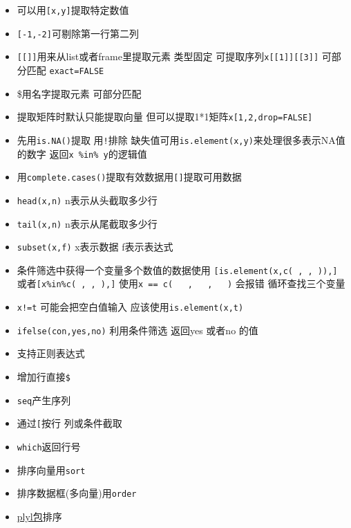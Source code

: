 \documentclass[
]{book}
\providecommand{\tightlist}{%
  \setlength{\itemsep}{0pt}\setlength{\parskip}{0pt}}
\begin{document}
\begin{itemize}
\tightlist
\item
  可以用\texttt{{[}x,y{]}}提取特定数值
\item
  \texttt{{[}-1,-2{]}}可剔除第一行第二列
\item
  \texttt{{[}{[}{]}{]}}用来从list或者frame里提取元素 类型固定 可提取序列\texttt{x{[}{[}1{]}{]}{[}{[}3{]}{]}} 可部分匹配 \texttt{exact=FALSE}
\item
  \$用名字提取元素 可部分匹配
\item
  提取矩阵时默认只能提取向量 但可以提取1*1矩阵\texttt{x{[}1,2,drop=FALSE{]}}
\item
  先用\texttt{is.NA()}提取 用\texttt{!}排除 缺失值可用\texttt{is.element(x,y)}来处理很多表示NA值的数字 返回\texttt{x\ \%in\%\ y}的逻辑值
\item
  用\texttt{complete.cases()}提取有效数据用\texttt{{[}{]}}提取可用数据
\item
  \texttt{head(x,n)} n表示从头截取多少行
\item
  \texttt{tail(x,n)} n表示从尾截取多少行
\item
  \texttt{subset(x,f)} x表示数据 f表示表达式
\item
  条件筛选中获得一个变量多个数值的数据使用 \texttt{{[}is.element(x,c(\textquotesingle{}\ \textquotesingle{},\textquotesingle{}\ \textquotesingle{},\textquotesingle{}\ \textquotesingle{})),{]}} 或者\texttt{{[}x\%in\%c(\textquotesingle{}\ \textquotesingle{},\textquotesingle{}\ \textquotesingle{},\textquotesingle{}\ \textquotesingle{}),{]}} 使用\texttt{x\ ==\ c(\ \textquotesingle{}\ \textquotesingle{}\ ,\ \textquotesingle{}\ \textquotesingle{}\ ,\ \textquotesingle{}\ \textquotesingle{}\ )} 会报错 循环查找三个变量
\item
  \texttt{x!=\textquotesingle{}t\textquotesingle{}} 可能会把空白值输入 应该使用\texttt{is.element(x,\textquotesingle{}t\textquotesingle{})}
\item
  \texttt{ifelse(con,yes,no)} 利用条件筛选 返回yes 或者no 的值
\item
  支持正则表达式
\item
  增加行直接\texttt{\$}
\item
  \texttt{seq}产生序列
\item
  通过\texttt{{[}}按行 列或条件截取
\item
  \texttt{which}返回行号
\item
  排序向量用\texttt{sort}
\item
  排序数据框(多向量)用\texttt{order}
\item
  \href{http://plyr.had.co.nz/09-user/}{plyl包}排序
\end{itemize}
\end{document}
